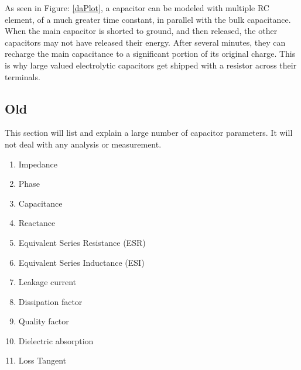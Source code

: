 As seen in Figure: \ref{daPlot}, a capacitor can be modeled with multiple RC element, of a much greater time constant, in parallel with the bulk capacitance. When the main capacitor is shorted to ground, and then released, the other capacitors may not have released their energy. After several minutes, they can recharge the main capacitance to a significant portion of its original charge. This is why large valued electrolytic capacitors get shipped with a resistor across their terminals.

\subsection{Old}

This section will list and explain a large number of capacitor parameters. It will not deal with any analysis or measurement.

\begin {enumerate}
    \item Impedance
    \item Phase
    \item Capacitance
    \item Reactance
    \item Equivalent Series Resistance (ESR)
    \item Equivalent Series Inductance (ESI)
    \item Leakage current
    \item Dissipation factor
    \item Quality factor
    \item Dielectric absorption
    \item Loss Tangent
\end {enumerate}

